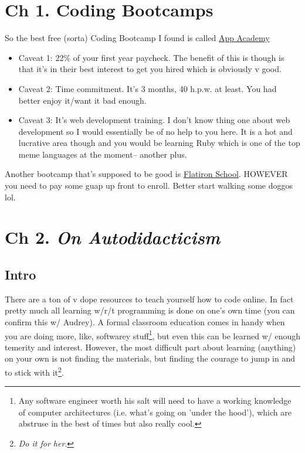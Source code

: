 \documentclass[11pt]{article}
\date{\today}
\title{}
\begin{document}
\tableofcontents

\section{Ch 1.  Coding Bootcamps}
\label{sec:org4fc2d88}

So the best free (sorta) Coding Bootcamp I found is called \href{https://www.appacademy.io/ }{App Academy } 
\begin{itemize}
\item Caveat 1: 22\% of your first year paycheck. The benefit of this is though is that it's in their best interest to get you hired which is obviously v good.
\item Caveat 2: Time commitment. It's 3 months, 40 h.p.w. at least. You had better enjoy it/want it bad enough.
\item Caveat 3: It's web development training. I don't know thing one about web development so I would essentially be of no help to you here. It is a hot and lucrative area though and you would be learning Ruby which is one of the top meme languages at the moment-- another plus.
\end{itemize}

Another bootcamp that's supposed to be good is \href{https://flatironschool.com/programs/nyc-web-developer-career-course/}{Flatiron School}. HOWEVER you need to pay some guap up front to enroll. Better start walking some doggos lol.


\section{Ch 2. \emph{On Autodidacticism}}
\label{sec:orgf3e7da7}

\subsection{Intro}
\label{sec:org8185cf3}

There are a ton of v dope resources to teach yourself how to code online. In fact pretty much all learning w/r/t programming is done on one's own time (you can confirm this w/ Audrey). A formal classroom education comes in handy when you are doing more, like, softwarey stuff\footnote{Any software engineer worth his salt will need to have a working knowledge of computer architectures (i.e. what's going on 'under the hood'), which are abstruse in the best of times but also really cool.}, but even this can be learned w/ enough temerity and interest. However, the most difficult part about learning (anything) on your own is not finding the materials, but finding the courage to jump in and to stick with it\footnote{\emph{Do it for her}.}.
\end{document}
